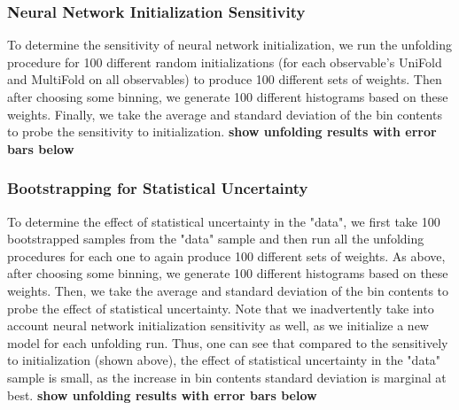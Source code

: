 \clearpage

\subsubsection{Neural Network Initialization Sensitivity}
\label{sec:modeldep:NNinit}
To determine the sensitivity of neural network initialization, we run the unfolding procedure for 100 different random initializations (for each observable's UniFold and MultiFold on all observables) to produce 100 different sets of weights.  Then after choosing some binning, we generate 100 different histograms based on these weights.  Finally, we take the average and standard deviation of the bin contents to probe the sensitivity to initialization.  \textbf{show unfolding results with error bars below}

\subsubsection{Bootstrapping for Statistical Uncertainty}
\label{sec:modeldep:bootstrap}
To determine the effect of statistical uncertainty in the "data", we first take 100 bootstrapped samples from the "data" sample and then run all the unfolding procedures for each one to again produce 100 different sets of weights.  As above, after choosing some binning, we generate 100 different histograms based on these weights.  Then, we take the average and standard deviation of the bin contents to probe the effect of statistical uncertainty.  Note that we inadvertently take into account neural network initialization sensitivity as well, as we initialize a new model for each unfolding run.  Thus, one can see that compared to the sensitively to initialization (shown above), the effect of statistical uncertainty in the "data" sample is small, as the increase in bin contents standard deviation is marginal at best. \textbf{show unfolding results with error bars below}
